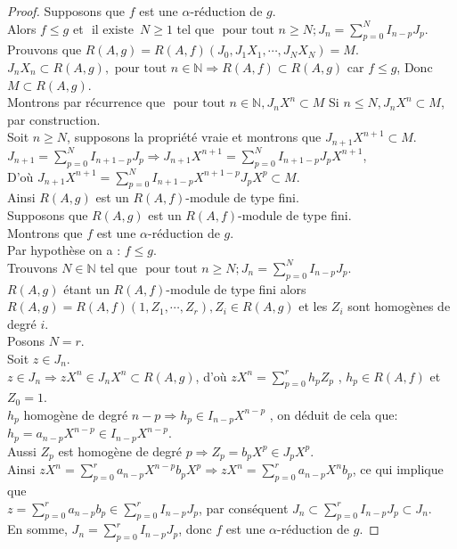 \begin{proof}
	Supposons que $f$ est une $\alpha$-réduction de $g$.\\
	Alors $f \leq g$ et $\text{ il existe } \, N \geq 1$ tel que $\text{ pour tout } n \geq N ; J_n = \displaystyle \sum_{p=0}^{N}{I_{n-p} J_p}$.\\
	Prouvons que $R(A,g) = R(A,f)(J_0, J_1X_1, \cdots , J_NX_N) = M$.\\
	$J_nX_n \subset R(A,g), \text{ pour tout } n \in \mathbb{N} \Rightarrow R(A,f) \subset R(A,g)$ car $f \leq g$,
	Donc $M \subset R(A,g)$.\\
	Montrons par récurrence que $\text{ pour tout } n \in \mathbb{N}, J_nX^n \subset M$
	Si $n \leq N, J_nX^n \subset M$, par construction.\\
	Soit $n \geq N$, supposons la propriété vraie et montrons que $J_{n+1}X^{n+1} \subset M$.\\
	$J_{n+1} = \displaystyle \sum_{p=0}^{N}{I_{n+1-p} J_p} \Rightarrow J_{n+1}X^{n+1} = \displaystyle \sum_{p=0}^{N}{I_{n+1-p} J_pX^{n+1}}$, \\
	D’où $ J_{n+1}X^{n+1} = \displaystyle \sum_{p=0}^{N}{I_{n+1-p}X^{n+1-p} J_pX^{p}} \subset M$.\\
	Ainsi $R(A,g)$ est un $R(A,f)$-module de type fini.\\
	Supposons que $R(A,g)$ est un $R(A,f)$-module de type fini.\\
	Montrons que $f$ est une $\alpha$-réduction de $g$.\\
	Par hypothèse on a : $f \leq g$.\\
	Trouvons $N \in \mathbb{N}$ tel que $\text{ pour tout } n \geq N ; J_n = \displaystyle \sum_{p=0}^{N}{I_{n-p} J_p}$.\\
	$R(A,g)$ étant un $R(A,f)$-module de type fini alors \\
	$R(A,g) = R(A,f)(1, Z_1, \cdots , Z_r), Z_i \in R(A,g)$ et les $Z_i$ sont homogènes de degré $i$.\\
	Posons $N=r$.\\
	Soit $z \in J_n$.\\
	$z \in J_n \Rightarrow zX^n \in J_nX^n \subset R(A,g)$, d'où $zX^n = \displaystyle \sum_{p=0}^{r}{h_p Z_p}$ , $h_p \in R(A,f)$ et $Z_0 = 1$.\\
	$h_p$ homogène de degré $n-p \Rightarrow h_p \in I_{n-p}X^{n-p}$ , on déduit de cela que:\\ $h_p = a_{n-p}X^{n-p} \in I_{n-p}X^{n-p}$.\\
	Aussi $Z_p$ est homogène de degré $p \Rightarrow Z_p = b_{p}X^{p} \in J_pX^p$.\\
	Ainsi $zX^n = \displaystyle \sum_{p=0}^{r}{a_{n-p}X^{n-p} b_{p}X^{p}} \Rightarrow zX^n = \displaystyle \sum_{p=0}^{r}{a_{n-p}X^{n} b_{p}}$, ce qui implique que \\ $z = \displaystyle \sum_{p=0}^{r}{a_{n-p} b_{p}} \in \displaystyle \sum_{p=0}^{r}{I_{n-p} J_{p}}$, par conséquent $J_n \subset \displaystyle \sum_{p=0}^{r}{I_{n-p} J_{p}} \subset J_n$.\\
	En somme, $J_n = \displaystyle \sum_{p=0}^{r}{I_{n-p} J_{p}}$, donc $f$ est une $\alpha$-réduction de $g$.
\end{proof}
